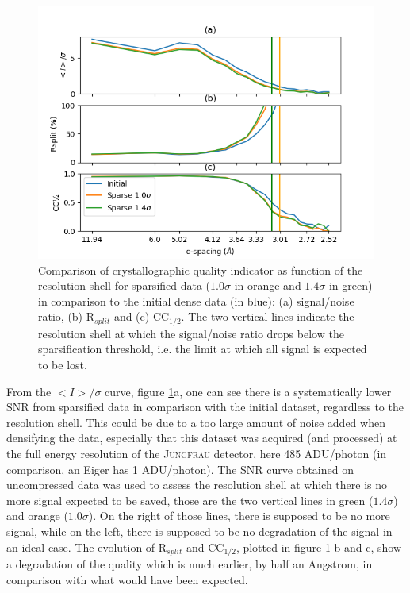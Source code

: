 \documentclass[preprint]{iucr}              %
\begin{document}
\begin{figure}
\label{f-NQO1}
\includegraphics[width=12cm]{NQO1/NQO1}
\caption{Comparison of crystallographic quality indicator as function of the resolution shell for sparsified data ($1.0\sigma$ in orange and $1.4\sigma$ in green) in comparison to the initial dense data (in blue):
(a) signal/noise ratio, (b) R$_{split}$ and (c) CC$_{1/2}$.
The two vertical lines indicate the resolution shell at which the signal/noise ratio drops below the sparsification threshold, i.e. the limit at which all signal is expected to be lost.}

\end{figure}

From the $<I>/\sigma$ curve, figure \ref{f-NQO1}a, one can see there is a systematically lower SNR from sparsified data in comparison with the initial dataset, regardless to the resolution shell. 
This could be due to a too large amount of noise added when densifying the data, especially that this dataset was acquired (and processed) at the full energy resolution of the \textsc{Jungfrau} detector, here 485 ADU/photon (in comparison, an Eiger has 1 ADU/photon).
The SNR curve obtained on uncompressed data was used to assess the resolution shell at which there is no more signal expected to be saved, those are the two vertical lines in green ($1.4\sigma$) and 
orange ($1.0\sigma$). 
On the right of those lines, there is supposed to be no more signal, while on the left, there is supposed to be no degradation of the signal in an ideal case.
The evolution of R$_{split}$ and CC$_{1/2}$, plotted in figure \ref{f-NQO1} b and c, show a degradation 
of the quality which is much earlier, by half an Angstrom, in comparison with what would have been expected. 
\end{document}
